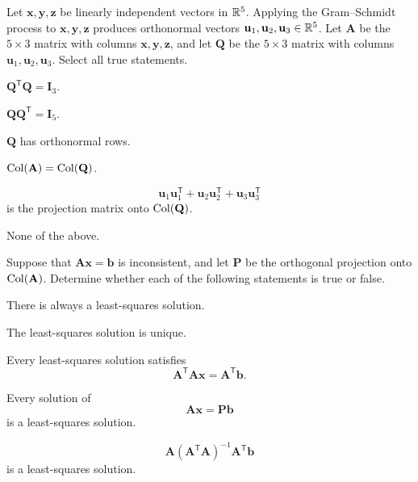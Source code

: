\begin{problem}
Let $\mathbf x,\mathbf y,\mathbf z$ be linearly independent vectors in $\mathbb{R}^5$. Applying the Gram--Schmidt process to $\mathbf x,\mathbf y,\mathbf z$ produces orthonormal vectors $\mathbf u_1,\mathbf u_2,\mathbf u_3\in\mathbb{R}^5$. Let $\mathbf A$ be the $5\times3$ matrix with columns $\mathbf x,\mathbf y,\mathbf z$, and let $\mathbf Q$ be the $5\times3$ matrix with columns $\mathbf u_1,\mathbf u_2,\mathbf u_3$. Select all true statements.
\begin{problemchoices}
\item $\mathbf Q^{\mathsf T}\mathbf Q=\mathbf I_3$.
\item $\mathbf Q\mathbf Q^{\mathsf T}=\mathbf I_5$.
\item $\mathbf Q$ has orthonormal rows.
\item $\operatorname{Col}(\mathbf A)=\operatorname{Col}(\mathbf Q)$.
\item
\[
\mathbf u_1\mathbf u_1^{\mathsf T}+\mathbf u_2\mathbf u_2^{\mathsf T}+\mathbf u_3\mathbf u_3^{\mathsf T}
\]
is the projection matrix onto $\operatorname{Col}(\mathbf Q)$.
\item None of the above.
\end{problemchoices}
\end{problem}

\begin{problem}
Suppose that $\mathbf A\mathbf x=\mathbf b$ is inconsistent, and let $\mathbf P$ be the orthogonal projection onto $\operatorname{Col}(\mathbf A)$. Determine whether each of the following statements is true or false.
\begin{problemchoices}
\item There is always a least-squares solution.
\item The least-squares solution is unique.
\item Every least-squares solution satisfies
\[
\mathbf A^{\mathsf T}\mathbf A\mathbf x=\mathbf A^{\mathsf T}\mathbf b.
\]
\item Every solution of
\[
\mathbf A\mathbf x=\mathbf P\mathbf b
\]
is a least-squares solution.
\item
\[
\mathbf A(\mathbf A^{\mathsf T}\mathbf A)^{-1}\mathbf A^{\mathsf T}\mathbf b
\]
is a least-squares solution.
\end{problemchoices}
\end{problem}

